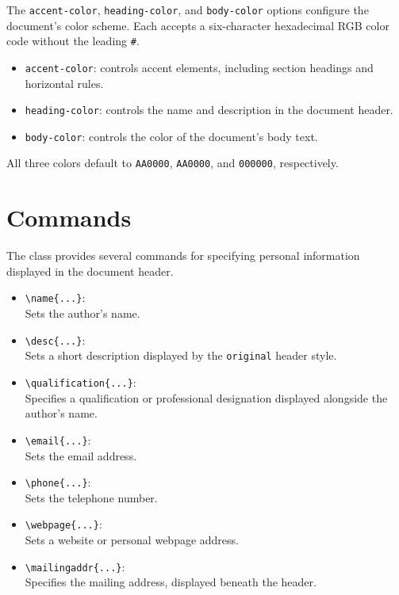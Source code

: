 \documentclass[10pt]{article}
\begin{document}
The \verb|accent-color|, \verb|heading-color|, and
\verb|body-color| options configure the document's color
scheme. Each accepts a six-character hexadecimal RGB color
code without the leading \verb|#|.

\begin{itemize}
    \item \verb|accent-color|: controls accent elements,
    including section headings and horizontal rules.

    \item \verb|heading-color|: controls the name and
    description in the document header.

    \item \verb|body-color|: controls the color of the
    document's body text.
\end{itemize}

All three colors default to \verb|AA0000|,
\verb|AA0000|, and \verb|000000|, respectively.

\section{Commands}

The class provides several commands for specifying
personal information displayed in the document header.

\begin{itemize}
    \item \verb|\name{...}|:\\
    Sets the author's name.

    \item \verb|\desc{...}|:\\
    Sets a short description displayed by the \texttt{original}
    header style.

    \item \verb|\qualification{...}|:\\
    Specifies a qualification or professional designation
    displayed alongside the author's name.

    \item \verb|\email{...}|:\\
    Sets the email address.

    \item \verb|\phone{...}|:\\
    Sets the telephone number.

    \item \verb|\webpage{...}|:\\
    Sets a website or personal webpage address.

    \item \verb|\mailingaddr{...}|:\\
    Specifies the mailing address, displayed beneath
    the header.
\end{itemize}
\end{document}
